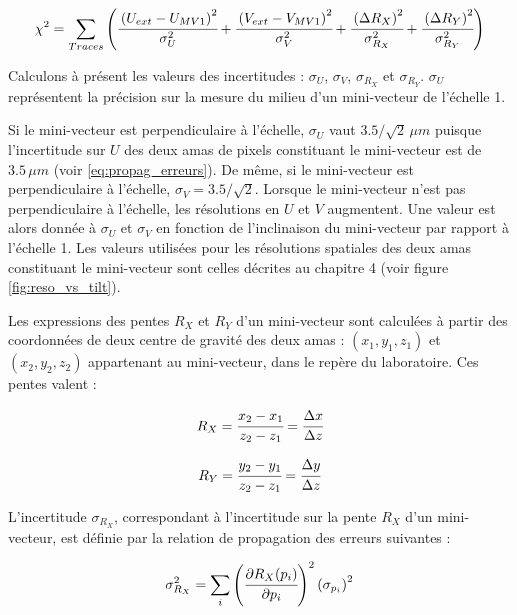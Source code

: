    \begin{equation}
      \chi^2 = \sum_{Traces} \left( \cfrac{\left({U_{ext}-U_{MV1}}\right)^2}{\sigma_U^2} + \cfrac{\left({V_{ext}-V_{MV1}}\right)^2}{\sigma_V^2} + \cfrac{\left({\Delta R_X}\right)^2}{\sigma_{R_X}^2} +  \cfrac{\left({\Delta R_Y}\right)^2}{\sigma_{R_Y}^2} \right)
   \end{equation}
   
   Calculons \`a pr\'esent les valeurs des incertitudes : $\sigma_U$, $\sigma_V$, $\sigma_{R_X}$ et $\sigma_{R_Y}$. $\sigma_U$ repr\'esentent la pr\'ecision sur la mesure du milieu d'un mini-vecteur de l'\'echelle 1.
   
   \medskip
   
   Si le mini-vecteur est perpendiculaire \`a l'\'echelle, $\sigma_U$ vaut  $3.5/\sqrt{2} \, \mu m$ puisque l'incertitude sur $U$ des deux amas de pixels constituant le mini-vecteur est de $3.5 \, \mu m$ (voir \ref{eq:propag_erreurs}). De m\^eme, si le mini-vecteur est perpendiculaire \`a l'\'echelle, $\sigma_V = 3.5/\sqrt{2}$. Lorsque le mini-vecteur n'est pas perpendiculaire \`a l'\'echelle, les r\'esolutions en $U$ et $V$ augmentent. Une valeur est alors donn\'ee \`a $\sigma_U$ et $\sigma_V$ en fonction de l'inclinaison du mini-vecteur par rapport \`a l'\'echelle 1. Les valeurs utilis\'ees pour les r\'esolutions spatiales des deux amas constituant le mini-vecteur sont celles d\'ecrites au chapitre 4 (voir figure \ref{fig:reso_vs_tilt}). 
   
   \medskip

   Les expressions des pentes $R_X$ et $R_Y$ d'un mini-vecteur sont calcul\'ees \`a partir des coordonn\'ees de deux centre de gravit\'e des deux amas : $(x_1,y_1,z_1)$ et $(x_2,y_2,z_2)$ appartenant au mini-vecteur, dans le rep\`ere du laboratoire. Ces pentes valent : 
   
   \begin{equation}
    R_X = \cfrac{x_2-x_1}{z_2-z_1} = \cfrac{\Delta x}{\Delta z}
   \end{equation}
   
   \begin{equation}
    R_Y = \cfrac{y_2-y_1}{z_2-z_1} = \cfrac{\Delta y}{\Delta z}
   \end{equation}
   
   L'incertitude $\sigma_{R_X}$, correspondant \`a l'incertitude sur la pente $R_X$ d'un mini-vecteur, est d\'efinie par la relation de propagation des erreurs suivantes : 
   
   \begin{equation}
     \sigma_{R_X}^2 = \sum_i \left( \cfrac{ \partial R_X(p_i)}{\partial p_i} \right)^2 \left( \sigma_{p_i} \right)^2
   \end{equation}

